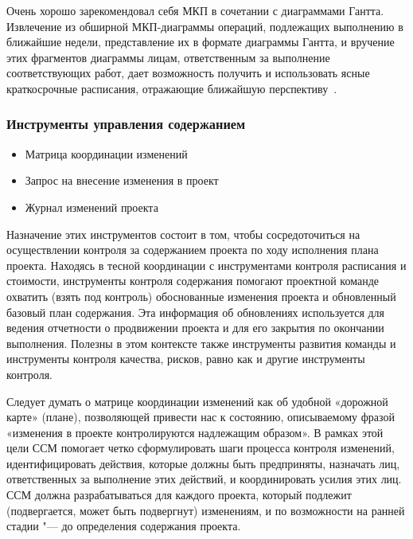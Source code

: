 \documentclass{../industrial-development}
\begin{document}
Очень хорошо зарекомендовал себя МКП в сочетании с диаграммами Гантта. Извлечение из обширной МКП-диаграммы операций, подлежащих выполнению
в ближайшие недели, представление их в формате диаграммы Гантта, и вручение этих фрагментов диаграммы лицам, ответственным за выполнение соответствующих работ, дает возможность получить и использовать ясные краткосрочные расписания, отражающие ближайшую перспективу~\cite[с.~219--244]{Miloshevich}.

\begin{frame} \frametitle{Инструменты управления содержанием}
  \begin{itemize}
     \item Матрица  координации  изменений
     \item Запрос на внесение изменения в проект
     \item Журнал изменений проекта
    \end{itemize}
\end{frame}

\lecturenotes

Назначение этих инструментов состоит в том, чтобы сосредоточиться на осуществлении контроля за содержанием проекта по ходу исполнения плана проекта. Находясь в тесной координации с инструментами контроля расписания и стоимости, инструменты контроля содержания помогают проектной команде
охватить (взять под контроль) обоснованные изменения проекта и обновленный базовый план содержания. Эта информация об обновлениях используется для ведения отчетности о продвижении проекта и для его закрытия по окончании выполнения. Полезны в этом контексте также инструменты развития команды и инструменты контроля качества, рисков, равно как и другие инструменты контроля.

Следует думать о матрице координации изменений как об удобной «дорожной карте» (плане), позволяющей привести нас к состоянию, описываемому фразой «изменения в проекте контролируются надлежащим образом». В рамках этой цели ССМ помогает четко сформулировать шаги процесса контроля изменений, идентифицировать действия, которые должны быть предприняты, назначать лиц, ответственных за выполнение этих действий, и координировать усилия этих лиц. ССМ должна разрабатываться для каждого проекта, который подлежит (подвергается, может быть подвергнут) изменениям, и по возможности на ранней стадии "--- до определения содержания проекта.
\end{document}

